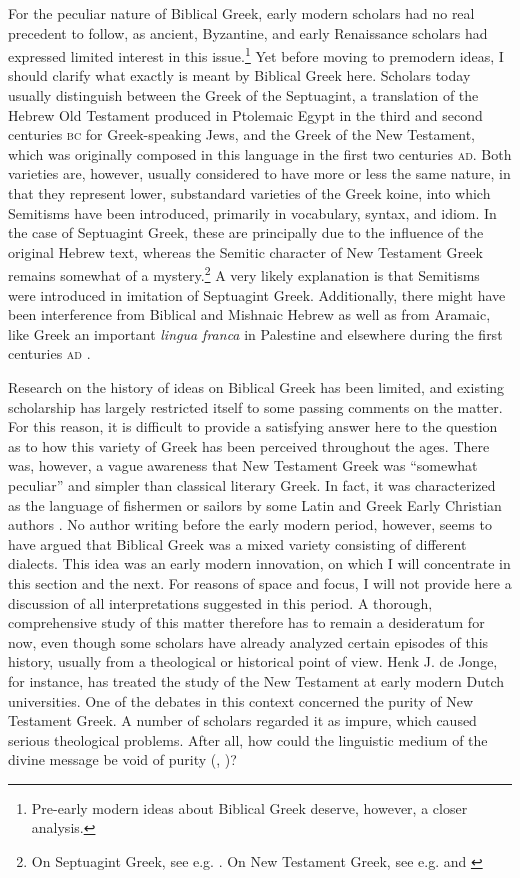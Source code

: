 For the peculiar nature of Biblical Greek, early modern scholars had no real precedent to follow, as ancient, Byzantine, and early Renaissance scholars had expressed limited interest in this issue.\footnote{Pre-early modern ideas about Biblical Greek deserve, however, a closer analysis.} Yet before moving to premodern ideas, I should clarify what exactly is meant by Biblical Greek here. Scholars today usually distinguish between the Greek of the Septuagint, a translation of the Hebrew Old Testament produced in Ptolemaic Egypt in the third and second centuries \textsc{bc} for Greek-speaking Jews, and the Greek of the New Testament, which was originally composed in this language in the first two centuries \textsc{ad}. Both varieties are, however, usually considered to have more or less the same nature, in that they represent lower, substandard varieties of the Greek koine, into which Semitisms have been introduced, primarily in vocabulary, syntax, and idiom. In the case of Septuagint Greek, these are principally due to the influence of the original Hebrew text, whereas the Semitic character of New Testament Greek remains somewhat of a mystery.\footnote{On Septuagint Greek, see e.g. \citet[106-108]{Horrocks2010}. On New Testament Greek, see e.g. \citet{Janse2007} and \citet{Porter2013}} A very likely explanation is that Semitisms were introduced in imitation of Septuagint Greek. Additionally, there might have been interference from Biblical and Mishnaic Hebrew as well as from Aramaic, like Greek an important \textit{lingua franca} in Palestine and elsewhere during the first centuries \textsc{ad} \citep{Janse2007}.

Research on the history of ideas on Biblical Greek has been limited, and existing scholarship has largely restricted itself to some passing comments on the matter. For this reason, it is difficult to provide a satisfying answer here to the question as to how this variety of Greek has been perceived throughout the ages. There was, however, a vague awareness that New Testament Greek was “somewhat peculiar” and simpler than classical literary Greek. In fact, it was characterized as the language of fishermen or sailors by some Latin and Greek Early Christian authors \citep[647]{Janse2007}. No author writing before the early modern period, however, seems to have argued that Biblical Greek was a mixed variety consisting of different dialects. This idea was an early modern innovation, on which I will concentrate in this section and the next. For reasons of space and focus, I will not provide here a discussion of all interpretations suggested in this period. A thorough, comprehensive study of this matter therefore has to remain a desideratum for now, even though some scholars have already analyzed certain episodes of this history, usually from a theological or historical point of view. Henk J. de Jonge, for instance, has treated the study of the New Testament at early modern Dutch universities. One of the debates in this context concerned the purity of New Testament Greek. A number of scholars regarded it as impure, which caused serious theological problems. After all, how could the linguistic medium of the divine message be void of purity (\citealp[35-38]{De1980}, \citealp[117-118]{De1981})?

